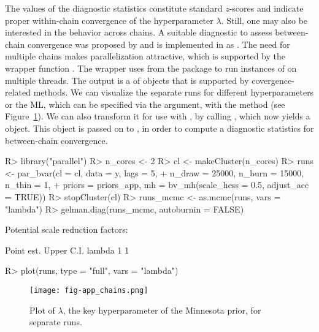 \documentclass[article,nojss]{jss} %
\begin{document}
\begin{appendix}
The values of the diagnostic statistics constitute standard $z$-scores and indicate proper within-chain convergence of the hyperparameter $\lambda$.
Still, one may also be interested in the behavior across chains. A suitable diagnostic to assess between-chain convergence was proposed by \cite{gelman1992} and is implemented in  as .
The need for multiple chains makes parallelization attractive, which is supported by the wrapper function . The wrapper uses  from the  package \citep{R} to run instances of  on multiple threads. The output is a  of  objects that is supported by covergence-related methods.
We can visualize the separate runs for different hyperparameters or the ML, which can be specified via the  argument, with the  method (see Figure~\ref{fig:app_chains}). We can also transform it for use with , by calling , which now yields a  object.
This object is passed on to , in order to compute a diagnostic statistics for between-chain convergence.

\begin{Schunk}
\begin{Sinput}
R> library("parallel")
R> n_cores <- 2
R> cl <- makeCluster(n_cores)
R> runs <- par_bvar(cl = cl, data = y, lags = 5,
+    n_draw = 25000, n_burn = 15000, n_thin = 1,
+    priors = priors_app, mh = bv_mh(scale_hess = 0.5, adjust_acc = TRUE))
R> stopCluster(cl)
R> runs_mcmc <- as.mcmc(runs, vars = "lambda")
R> gelman.diag(runs_mcmc, autoburnin = FALSE)
\end{Sinput}
\begin{Soutput}
Potential scale reduction factors:

       Point est. Upper C.I.
lambda          1          1
\end{Soutput}
\end{Schunk}
\begin{Schunk}
\begin{Sinput}
R> plot(runs, type = "full", vars = "lambda")
\end{Sinput}
\end{Schunk}

\begin{figure}[ht]
	\centering
  \texttt{[image: fig-app\_chains.png]}
	\caption{Plot of $\lambda$, the key hyperparameter of the Minnesota prior, for separate runs.}
	\label{fig:app_chains}
\end{figure}



\end{appendix}
\end{document}
